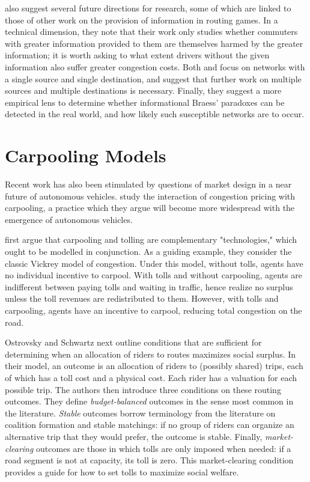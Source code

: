 \documentclass[JEL]{AEA}
\begin{document}
\cite{acemoglu-2016} also suggest several future directions for research, some of which are linked to those of other work on the provision of information in routing games. In a technical dimension, they note that their work only studies whether commuters with greater information provided to them are themselves harmed by the greater information; it is worth asking to what extent drivers without the given information also suffer greater congestion costs. Both \cite{das-2017} and \cite{acemoglu-2016} focus on networks with a single source and single destination, and suggest that further work on multiple sources and multiple destinations is necessary. Finally, they suggest a more empirical lens to determine whether informational Braess' paradoxes can be detected in the real world, and how likely such susceptible networks are to occur.

\section{Carpooling Models}
\label{carpooling-models}

Recent work has also been stimulated by questions of market design in a near future of autonomous vehicles. \cite{ostrovsky-2018} study the interaction of congestion pricing with carpooling, a practice which they argue will become more widespread with the emergence of autonomous vehicles.

\cite{ostrovsky-2018} first argue that carpooling and tolling are complementary "technologies," which ought to be modelled in conjunction. As a guiding example, they consider the classic Vickrey model of congestion. Under this model, without tolls, agents have no individual incentive to carpool. With tolls and without carpooling, agents are indifferent between paying tolls and waiting in traffic, hence realize no surplus unless the toll revenues are redistributed to them. However, with tolls and carpooling, agents have an incentive to carpool, reducing total congestion on the road.

Ostrovsky and Schwartz next outline conditions that are sufficient for determining when an allocation of riders to routes maximizes social surplus. In their model, an outcome is an allocation of riders to (possibly shared) trips, each of which has a toll cost and a physical cost. Each rider has a valuation for each possible trip. The authors then introduce three conditions on these routing outcomes. They define \textit{budget-balanced} outcomes in the sense most common in the literature. \textit{Stable} outcomes borrow terminology from the literature on coalition formation and stable matchings: if no group of riders can organize an alternative trip that they would prefer, the outcome is stable. Finally, \textit{market-clearing} outcomes are those in which tolls are only imposed when needed: if a road segment is not at capacity, its toll is zero. This market-clearing condition provides a guide for how to set tolls to maximize social welfare. 
\end{document}
